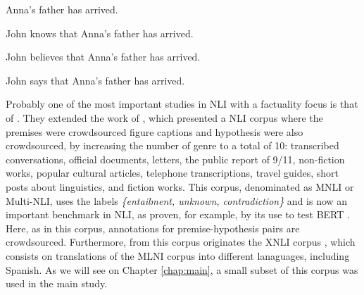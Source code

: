 \begin{exe}
  \ex
    \begin{xlist}
          \item Anna's father has arrived. \label{ex:verfac1a}
          \item John knows that Anna's father has arrived. \label{ex:verfac1b}
          \item John believes that Anna's father has arrived. \label{ex:verfac1c}
          \item John says that Anna's father has arrived. \label{ex:verfac1d}
        \end{xlist}
\end{exe}

Probably one of the most important studies in NLI with a factuality focus is that of \citet{williams2017broad}. They extended the work of \citet{bowman2015large}, which presented a NLI corpus where the premises were crowdsourced figure captions and hypothesis were also crowdsourced, by increasing the number of genre to a total of 10: transcribed conversations, official documents, letters, the public report of 9/11, non-fiction works, popular cultural articles, telephone transcriptions, travel guides, short posts about linguistics, and fiction works. This corpus, denominated as MNLI or Multi-NLI, uses the labels \textit{\{entailment, unknown, contradiction\}} and is now an important benchmark in NLI, as proven, for example, by its use to test BERT \citep{devlin2018bert}. Here, as in this corpus, annotations for premise-hypothesis pairs are crowdsourced. Furthermore, from this corpus originates the XNLI corpus \citep{conneau2018xnli}, which consists on translations of the MLNI corpus into different lanaguages, including Spanish. As we will see on Chapter \ref{chap:main}, a small subset of this corpus was used in the main study.\\

